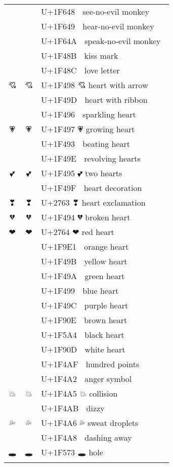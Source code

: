 \documentclass[a4paper,12pt]{article}
\newcommand{\fontA}[1]{{\fontspec[RawFeature={mode=harf,+dist,+ccmp}]{Segoe UI Emoji} #1}}
\newcommand{\fontB}[1]{{\fontspec[RawFeature={mode=harf,+dist,+ccmp}]{Noto Color Emoji} #1}}
\begin{document}
\begin{longtable}[c]{ccp{0.8\linewidth}}
\fontA{🙈}&\fontB{🙈}&U+1F648 🙈 see-no-evil monkey\\
\fontA{🙉}&\fontB{🙉}&U+1F649 🙉 hear-no-evil monkey\\
\fontA{🙊}&\fontB{🙊}&U+1F64A 🙊 speak-no-evil monkey\\
\fontA{💋}&\fontB{💋}&U+1F48B 💋 kiss mark\\
\fontA{💌}&\fontB{💌}&U+1F48C 💌 love letter\\
\fontA{💘}&\fontB{💘}&U+1F498 💘 heart with arrow\\
\fontA{💝}&\fontB{💝}&U+1F49D 💝 heart with ribbon\\
\fontA{💖}&\fontB{💖}&U+1F496 💖 sparkling heart\\
\fontA{💗}&\fontB{💗}&U+1F497 💗 growing heart\\
\fontA{💓}&\fontB{💓}&U+1F493 💓 beating heart\\
\fontA{💞}&\fontB{💞}&U+1F49E 💞 revolving hearts\\
\fontA{💕}&\fontB{💕}&U+1F495 💕 two hearts\\
\fontA{💟}&\fontB{💟}&U+1F49F 💟 heart decoration\\
\fontA{❣}&\fontB{❣}&U+2763 ❣ heart exclamation\\
\fontA{💔}&\fontB{💔}&U+1F494 💔 broken heart\\
\fontA{❤}&\fontB{❤}&U+2764 ❤ red heart\\
\fontA{🧡}&\fontB{🧡}&U+1F9E1 🧡 orange heart\\
\fontA{💛}&\fontB{💛}&U+1F49B 💛 yellow heart\\
\fontA{💚}&\fontB{💚}&U+1F49A 💚 green heart\\
\fontA{💙}&\fontB{💙}&U+1F499 💙 blue heart\\
\fontA{💜}&\fontB{💜}&U+1F49C 💜 purple heart\\
\fontA{🤎}&\fontB{🤎}&U+1F90E 🤎 brown heart\\
\fontA{🖤}&\fontB{🖤}&U+1F5A4 🖤 black heart\\
\fontA{🤍}&\fontB{🤍}&U+1F90D 🤍 white heart\\
\fontA{💯}&\fontB{💯}&U+1F4AF 💯 hundred points\\
\fontA{💢}&\fontB{💢}&U+1F4A2 💢 anger symbol\\
\fontA{💥}&\fontB{💥}&U+1F4A5 💥 collision\\
\fontA{💫}&\fontB{💫}&U+1F4AB 💫 dizzy\\
\fontA{💦}&\fontB{💦}&U+1F4A6 💦 sweat droplets\\
\fontA{💨}&\fontB{💨}&U+1F4A8 💨 dashing away\\
\fontA{🕳}&\fontB{🕳}&U+1F573 🕳 hole\\

\end{longtable}
\end{document}
